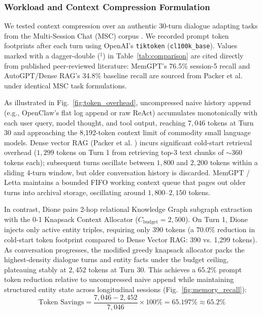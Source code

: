 \documentclass[conference,a4paper]{IEEEtran}
\begin{document}
\subsubsection{Workload and Context Compression Formulation}
We tested context compression over an authentic 30-turn dialogue adapting tasks from the Multi-Session Chat (MSC) corpus \cite{packer2023memgpt}. We recorded prompt token footprints after each turn using OpenAI's \texttt{tiktoken} (\texttt{cl100k\_base}). Values marked with a dagger-double ($^\ddagger$) in Table~\ref{tab:comparison} are cited directly from published peer-reviewed literature: MemGPT's 76.5\% session-5 recall and AutoGPT/Dense RAG's 34.8\% baseline recall are sourced from Packer et al. \cite{packer2023memgpt} under identical MSC task formulations.

As illustrated in Fig.~\ref{fig:token_overhead}, uncompressed naive history append (e.g., OpenClaw's flat log append or raw ReAct) accumulates monotonically with each user query, model thought, and tool output, reaching $7{,}046$ tokens at Turn 30 and approaching the 8,192-token context limit of commodity small language models. Dense vector RAG (Packer et al. \cite{packer2023memgpt}) incurs significant cold-start retrieval overhead ($1{,}299$ tokens on Turn 1 from retrieving top-3 text chunks of $\sim$360 tokens each); subsequent turns oscillate between $1{,}800$ and $2{,}200$ tokens within a sliding 4-turn window, but older conversation history is discarded. MemGPT / Letta maintains a bounded FIFO working context queue that pages out older turns into archival storage, oscillating around $1{,}800\text{--}2{,}150$ tokens. 

In contrast, Dione pairs 2-hop relational Knowledge Graph subgraph extraction with the 0-1 Knapsack Context Allocator ($C_{\text{budget}} = 2{,}500$). On Turn 1, Dione injects only active entity triples, requiring only $390$ tokens (a $70.0\%$ reduction in cold-start token footprint compared to Dense Vector RAG: 390 vs. 1,299 tokens). As conversation progresses, the modified greedy knapsack allocator packs the highest-density dialogue turns and entity facts under the budget ceiling, plateauing stably at $2{,}452$ tokens at Turn 30. This achieves a $65.2\%$ prompt token reduction relative to uncompressed naive append while maintaining structured entity state across longitudinal sessions (Fig.~\ref{fig:memory_recall}):
\begin{equation}
\text{Token Savings} = \frac{7{,}046 - 2{,}452}{7{,}046} \times 100\% = 65.197\% \approx 65.2\%
\end{equation}
\end{document}
